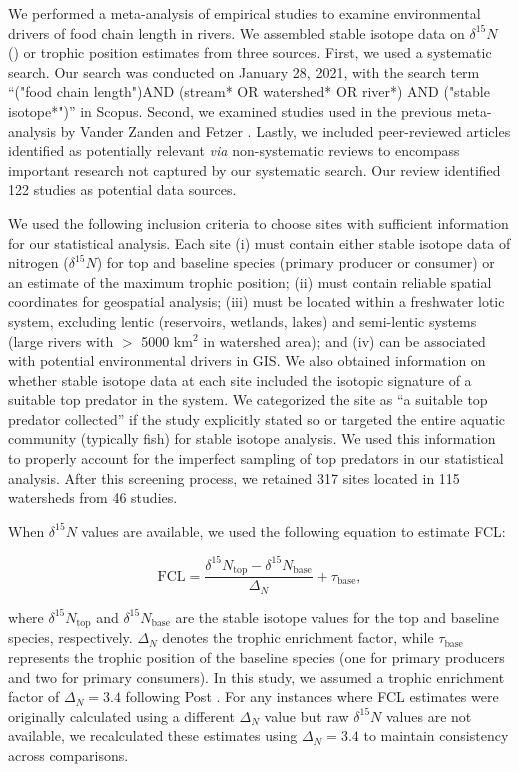 \documentclass[11pt, class=article, crop=false]{standalone}
\begin{document}
We performed a meta-analysis of empirical studies to examine environmental drivers of food chain length in rivers.
We assembled stable isotope data on $\delta^{15} N$ (\textperthousand) or trophic position estimates from three sources.
First, we used a systematic search. 
Our search was conducted on January 28, 2021, with the search term ``("food chain length")AND (stream* OR watershed* OR river*) AND ("stable isotope*")'' in Scopus.
Second, we examined studies used in the previous meta-analysis by Vander Zanden and Fetzer \citep{vander_zanden_global_2007}.
Lastly, we included peer-reviewed articles identified as potentially relevant \textit{via} non-systematic reviews to encompass important research not captured by our systematic search.
Our review identified 122 studies as potential data sources.

We used the following inclusion criteria to choose sites with sufficient information for our statistical analysis.
Each site (i) must contain either stable isotope data of nitrogen ($\delta^{15}N$) for top and baseline species (primary producer or consumer) or an estimate of the maximum trophic position; 
(ii) must contain reliable spatial coordinates for geospatial analysis; 
(iii) must be located within a freshwater lotic system, excluding lentic (reservoirs, wetlands, lakes) and semi-lentic systems (large rivers with $>$ 5000 km$^2$ in watershed area); and (iv) can be associated with potential environmental drivers in GIS.
We also obtained information on whether stable isotope data at each site included the isotopic signature of a suitable top predator in the system.
We categorized the site as ``a suitable top predator collected'' if the study explicitly stated so or targeted the entire aquatic community (typically fish) for stable isotope analysis.
We used this information to properly account for the imperfect sampling of top predators in our statistical analysis.
After this screening process, we retained 317 sites located in 115 watersheds from 46 studies. 

When $\delta^{15}N$ values are available, we used the following equation to estimate FCL:

\begin{equation}
    \mbox{FCL} = \frac{\delta^{15}N_{\text{top}} - \delta^{15}N_{\text{base}}}{\Delta_N} + \tau_{\text{base}},
    \label{eq:fcl-si}
\end{equation}

where $\delta^{15}N_{\text{top}}$ and $\delta^{15}N_{\text{base}}$ are the stable isotope values for the top and baseline species, respectively.
$\Delta_{N}$ denotes the trophic enrichment factor, while $\tau_{\text{base}}$ represents the trophic position of the baseline species (one for primary producers and two for primary consumers). 
In this study, we assumed a trophic enrichment factor of $\Delta_{N} = 3.4$ following Post \citep{post_using_2002}.
For any instances where FCL estimates were originally calculated using a different $\Delta_{N}$ value but raw $\delta^{15}N$ values are not available, we recalculated these estimates using $\Delta_{N} = 3.4$ to maintain consistency across comparisons.
\end{document}
